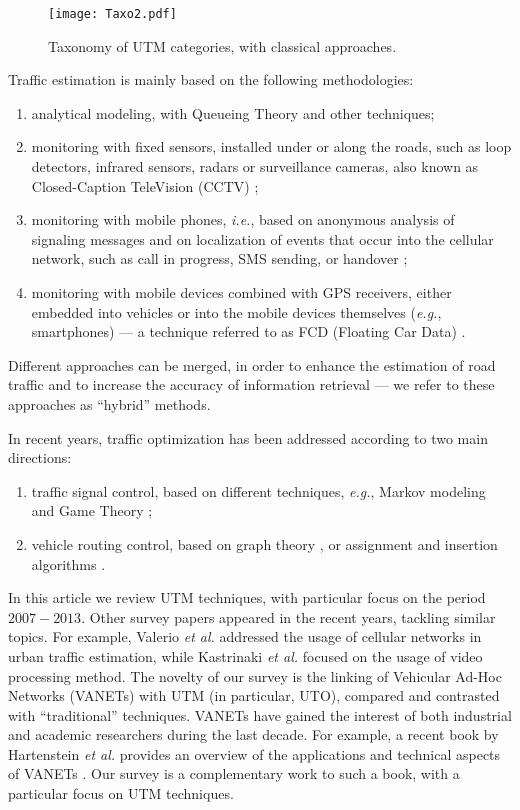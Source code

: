 \documentclass[10pt,onecolumn]{article}
\begin{document}
\begin{figure}[ht]
\centering
\texttt{[image: Taxo2.pdf]}
\caption{Taxonomy of UTM categories, with classical approaches.}
\label{fig:Taxo2}
\end{figure}

Traffic estimation is mainly based on the following methodologies:
\begin{enumerate}
\item analytical modeling, with Queueing Theory \cite{Woensel2006, Osorio2009} and other techniques;
\item monitoring with fixed sensors, installed under or along the roads, such as loop detectors, infrared sensors, radars or surveillance cameras, also known as Closed-Caption TeleVision (CCTV) \cite{Coifman2009};
\item monitoring with mobile phones, \textit{i.e.}, based on anonymous analysis of signaling messages and on localization of events that occur into the cellular network, such as call in progress, SMS sending, or handover \cite{Valerio2009, Calabrese2011};
\item monitoring with mobile devices combined with GPS receivers, either embedded into vehicles or into the mobile devices themselves (\textit{e.g.}, smartphones) --- a technique referred to as FCD (Floating Car Data) \cite{Messelodi2009, Tao2012, Li2009}.
\end{enumerate} 
Different approaches can be merged, in order to enhance the estimation of road traffic and to increase the accuracy of information retrieval --- we refer to these approaches as ``hybrid'' methods.

In recent years, traffic optimization has been addressed according to two main directions:
\begin{enumerate} 
\item traffic signal control, based on different techniques, \textit{e.g.}, Markov modeling \cite{Osorio2009} and Game Theory \cite{Cheng2006};
\item vehicle routing control, based on graph theory \cite{Miller2009} \cite{Scellato2010}, or assignment and insertion algorithms \cite{Fleischmann2004}.
\end{enumerate} 

In this article we review UTM techniques, with particular focus on the period $2007-2013$. 
Other survey papers appeared in the recent years, tackling similar topics. For example, Valerio \textit{et al.} \cite{valerio2009exploiting} addressed the usage of cellular networks in urban traffic estimation, while Kastrinaki \textit{et al.} \cite{kastrinaki2003survey} focused on the usage of video processing method.
The novelty of our survey is the linking of Vehicular Ad-Hoc Networks (VANETs) with UTM (in particular, UTO), compared and contrasted with ``traditional'' techniques. 
VANETs have gained the interest of both industrial and academic researchers during the last decade. 
For example, a recent book by Hartenstein \textit{et al.} provides an overview of the applications and technical aspects of VANETs \cite{HartensteinVANTE2009}. Our survey is a complementary work to such a book, with a particular focus on UTM techniques.
\end{document}
